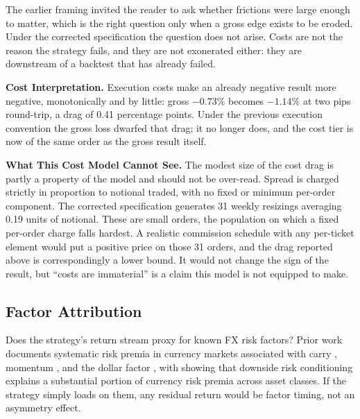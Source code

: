 \documentclass[11pt]{article}
\begin{document}
The earlier framing invited the reader to ask whether frictions were large enough to matter, which is the right question only when a gross edge exists to be eroded. Under the corrected specification the question does not arise. Costs are not the reason the strategy fails, and they are not exonerated either: they are downstream of a backtest that has already failed.

\textbf{Cost Interpretation.} Execution costs make an already negative result more negative, monotonically and by little: gross $-0.73\%$ becomes $-1.14\%$ at two pips round-trip, a drag of 0.41 percentage points. Under the previous execution convention the gross loss dwarfed that drag; it no longer does, and the cost tier is now of the same order as the gross result itself.

\textbf{What This Cost Model Cannot See.} The modest size of the cost drag is partly a property of the model and should not be over-read. Spread is charged strictly in proportion to notional traded, with no fixed or minimum per-order component. The corrected specification generates 31 weekly resizings averaging 0.19 units of notional. These are small orders, the population on which a fixed per-order charge falls hardest. A realistic commission schedule with any per-ticket element would put a positive price on those 31 orders, and the drag reported above is correspondingly a lower bound. It would not change the sign of the result, but ``costs are immaterial'' is a claim this model is not equipped to make.

\subsection{Factor Attribution}
\label{sec:factors}

Does the strategy's return stream proxy for known FX risk factors? Prior work documents systematic risk premia in currency markets associated with carry \citep{lustig2011common}, momentum \citep{menkhoff2012currency}, and the dollar factor \citep{verdelhan2018dollar}, with \citet{lettau2014conditional} showing that downside risk conditioning explains a substantial portion of currency risk premia across asset classes. If the strategy simply loads on them, any residual return would be factor timing, not an asymmetry effect.
\end{document}

